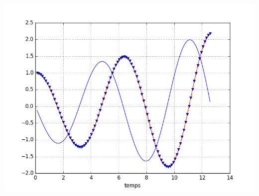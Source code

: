 \documentclass{article}
\begin{document}
\begin{center}
	\includegraphics[scale=0.5]{graphe4.png}
\end{center}
\end{document}
